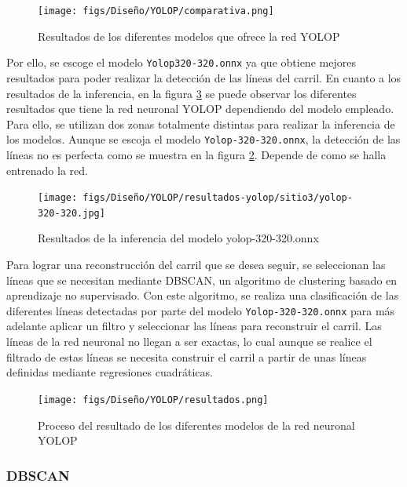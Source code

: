 \begin{figure} [H]
  \begin{center}
    \texttt{[image: figs/Diseño/YOLOP/comparativa.png]}
  \end{center}
  \caption{Resultados de los diferentes modelos que ofrece la red YOLOP}
  \label{fig:resultados_pesos_preentrenados}
\end{figure}
Por ello, se escoge el modelo \texttt{Yolop320-320.onnx} ya que obtiene mejores resultados para poder realizar la detección de las líneas del carril. 
En cuanto a los resultados de la inferencia, en la figura \ref{Proceso-YOLOP} 
se puede observar los diferentes resultados que tiene la red neuronal YOLOP dependiendo del modelo empleado. Para ello, se utilizan dos zonas totalmente distintas para realizar 
la inferencia de los modelos. Aunque se escoja el modelo \texttt{Yolop-320-320.onnx}, la detección de las líneas no es perfecta como se muestra en la figura 
\ref{f:Inferencia320-320}. Depende de como se halla entrenado la red. 
\begin{figure} [H]
  \begin{center}
    \texttt{[image: figs/Diseño/YOLOP/resultados-yolop/sitio3/yolop-320-320.jpg]}
  \end{center}
  \caption{Resultados de la inferencia del modelo yolop-320-320.onnx}
  \label{f:Inferencia320-320}
\end{figure}

Para lograr una reconstrucción del carril que se desea seguir, se seleccionan las líneas que se necesitan mediante DBSCAN, un algoritmo de clustering basado en aprendizaje no supervisado. 
Con este algoritmo, se realiza una clasificación de las diferentes líneas detectadas por parte del modelo \texttt{Yolop-320-320.onnx} para más adelante aplicar un filtro y seleccionar las líneas 
para reconstruir el carril. Las líneas de la red neuronal no llegan a ser exactas, lo cual aunque se realice el filtrado de estas líneas se necesita construir el carril a partir de unas líneas 
definidas mediante regresiones cuadráticas. 
\begin{figure} [H]
  \begin{center}
    \texttt{[image: figs/Diseño/YOLOP/resultados.png]}
  \end{center}
  \caption{Proceso del resultado de los diferentes modelos de la red neuronal YOLOP}
  \label{Proceso-YOLOP}
\end{figure}

\subsubsection{DBSCAN}
\label{sec:DBSCAN}

